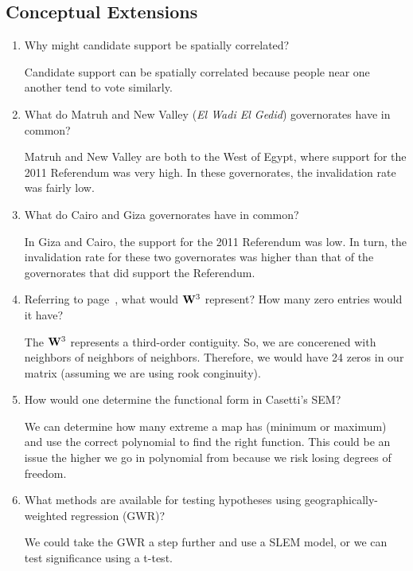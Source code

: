 \subsection*{Conceptual Extensions}
\begin{enumerate}

 \item Why might candidate support be spatially correlated?
\begin{solution}
Candidate support can be spatially correlated because people near one another tend to vote similarly.
\end{solution}
 
 \item What do Matruh and New Valley (\textit{El Wadi El Gedid}) governorates have in common?
\begin{solution}
Matruh and New Valley are both to the West of Egypt, where support for the 2011 Referendum was very high. In these governorates, the invalidation rate was fairly low. 
\end{solution}

 \item What do Cairo and Giza governorates have in common?
\begin{solution}
In Giza and Cairo, the support for the 2011 Referendum was low. In turn, the invalidation rate for these two governorates was higher than that of the governorates that did support the Referendum. 
\end{solution}
 
 \item Referring to page~\pageref{ex:Wcontiguous}, what would $\mathbf{W}^3$ represent? How many zero entries would it have?
\begin{solution}
The $\mathbf{W}^3$ represents a third-order contiguity. So, we are concerened with neighbors of neighbors of neighbors. Therefore, we would have 24 zeros in our matrix (assuming we are using rook conginuity).
\end{solution}
 
 \item How would one determine the functional form in Casetti's SEM?
\begin{solution}
We can determine how many extreme a map has (minimum or maximum) and use the correct polynomial to find the right function. This could be an issue the higher we go in polynomial from because we risk losing degrees of freedom.
\end{solution}
 
 \item What methods are available for testing hypotheses using geographically-weighted regression (GWR)?
\begin{solution}
We could take the GWR a step further and use a SLEM model, or we can test significance using a t-test.
\end{solution}
 
\end{enumerate}







